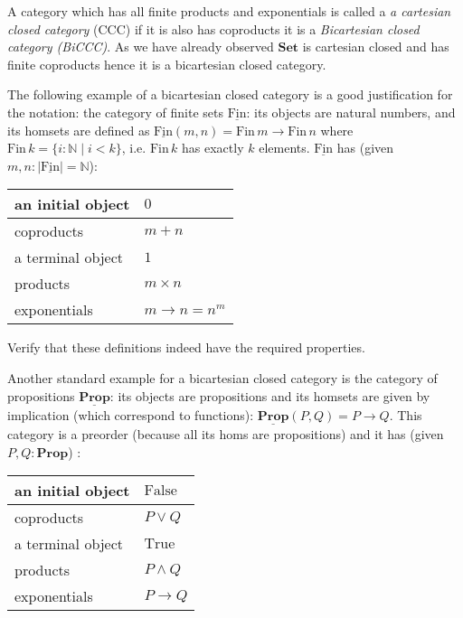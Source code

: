 \documentclass{article}
\newcommand{\Prop}{\mathbf{Prop}}
\newcommand{\True}{\mathrm{True}}
\newcommand{\False}{\mathrm{False}}
\newcommand{\Set}{\mathbf{Set}}
\newcommand{\cat}[1]{\underline{\mathbf{#1}}}
\newcommand{\obj}[1]{|#1|}
\newcommand{\Nat}{\mathbb{N}}
\newcommand{\Fin}{\mathrm{Fin}}
\begin{document}
A category which has all finite products and exponentials is called a \emph{a cartesian closed category} (CCC) if it is also has coproducts it is a \emph{Bicartesian closed category (BiCCC)}. As we have already observed $\Set$ is cartesian closed and has finite coproducts hence it is a bicartesian closed category. 

The following example of a bicartesian closed category is a good justification for the notation: the category of finite sets $\cat{\Fin}$: its objects are natural numbers, and its homsets are defined as $\cat{\Fin}(m,n) = \Fin\, m \to \Fin\,n$ where $\Fin\,k = \{ i : \Nat \mid i < k\}$, i.e. $\Fin\,k$ has exactly $k$ elements. $\cat{\Fin}$ has (given $m,n : \obj{\cat{\Fin}}=\Nat$):

\begin{tabular}{|l|l|}
\hline
an initial object & $0$ \\ \hline
coproducts & $m + n$ \\ \hline
a terminal object & $1$ \\\hline
products & $m\times n$ \\\hline
exponentials & $m \to n = n^m$\\\hline
\end{tabular}


\begin{Exercise}
Verify that these definitions indeed have the required properties.
\end{Exercise}

Another standard example for a bicartesian closed category is the category of propositions $\cat{\Prop}$: its objects are propositions and its homsets are given by implication (which correspond to functions): $\cat{\Prop}(P,Q) = P \to Q$. This category is a preorder (because all its homs are propositions) and it has (given $P,Q : \Prop$) :

\begin{tabular}{|l|l|}
\hline
an initial object & $\False$ \\\hline
coproducts & $P \vee Q$ \\ \hline
a terminal object & $\True$ \\\hline
products & $P \wedge Q$ \\\hline
exponentials & $P \to Q$\\\hline
\end{tabular}
\end{document}
